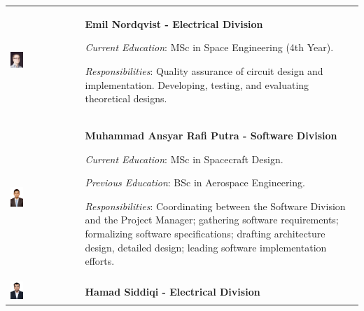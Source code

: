 \begin{longtable}[]{m{} m{}}
\includegraphics[width=0.2\textwidth]{1-introduction/img/emil-nordqvist.jpg} & \textbf{Emil Nordqvist - Electrical Division}

\smallskip
\textit{Current Education}: MSc in Space Engineering (4th Year).

\smallskip
\textit{Responsibilities}: Quality assurance of circuit design and implementation. Developing, testing, and evaluating theoretical designs.  \bigskip
\\

\includegraphics[width=0.2\textwidth]{1-introduction/img/muhammad-ansyar-rafi-putra.jpg} & \textbf{Muhammad Ansyar Rafi Putra - Software Division}

\smallskip
\textit{Current Education}: MSc in Spacecraft Design.

\smallskip
\textit{Previous Education}: BSc in Aerospace Engineering.


\smallskip 
\textit{Responsibilities}: Coordinating between the Software Division and the Project Manager; gathering software requirements; formalizing software specifications; drafting architecture design, detailed design; leading software implementation efforts.
\bigskip
\\

\includegraphics[width=0.2\textwidth]{1-introduction/img/hamad-saddiqi.jpg} & \textbf{Hamad Siddiqi - Electrical Division}



\end{longtable}
